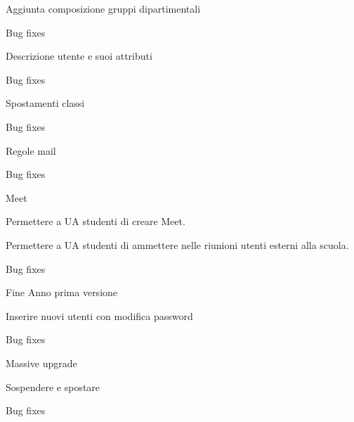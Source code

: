 \begin{changelog}[author=JOHN DOE, sectioncmd=\chapter*]
	\begin{version}[v=1.0.6,
		date=2023-08-14]
		\added
		\item Aggiunta composizione gruppi dipartimentali
		\fixed
		\item Bug fixes
	\end{version}
	\begin{version}[v=1.0.5,
		date=2023-08-11]
		\added
		\item Descrizione utente e suoi attributi
		\fixed
		\item Bug fixes
	\end{version}
	\begin{version}[v=1.0.4,
		date=2023-07-25]
		\added
		\item Spostamenti classi
		\fixed
		\item Bug fixes
	\end{version}
	\begin{version}[v=1.0.3,
		date=2023-07-25]
		\added
		\item Regole mail
		\fixed
		\item Bug fixes
	\end{version}
		\begin{version}[v=1.0.2,
		date=2023-07-21]
		\added
		\item Meet
		\item Permettere a  UA studenti di creare Meet.
		\item Permettere a UA studenti di ammettere nelle riunioni utenti esterni alla scuola.
		\fixed
		\item Bug fixes
	\end{version}
	\begin{version}[v=1.0.1,
		date=2023-07-17]
		\added
		\item Fine Anno prima versione
		\item Inserire nuovi utenti con modifica password
		\fixed
		\item Bug fixes
	\end{version}
	\begin{version}[v=1.0.0,
		date=2023-07-15]
		\added
		\item Massive upgrade
		\item Sospendere e spostare
		\fixed
		\item Bug fixes
	\end{version}
	\end{changelog}
	\listoftodos